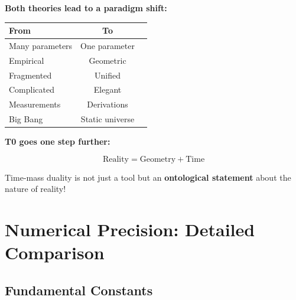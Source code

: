 	\begin{gemeinsam}
		\textbf{Both theories lead to a paradigm shift:}
		
		\begin{center}
			\begin{tabular}{lcc}
				\toprule
				\textbf{From} & \textbf{To} \\
				\midrule
				Many parameters & One parameter \\
				Empirical & Geometric \\
				Fragmented & Unified \\
				Complicated & Elegant \\
				Measurements & Derivations \\
				Big Bang & Static universe \\
				\bottomrule
			\end{tabular}
		\end{center}
	\end{gemeinsam}
	
	\begin{vorteil}
		\textbf{T0 goes one step further:}
		
		\begin{equation}
			\boxed{\text{Reality} = \text{Geometry} + \text{Time}}
		\end{equation}
		
		Time-mass duality is not just a tool but an \textbf{ontological statement} about the nature of reality!
	\end{vorteil}
	
	\section{Numerical Precision: Detailed Comparison}
	
	\subsection{Fundamental Constants}
	
	\begin{center}
	\end{center}
	
